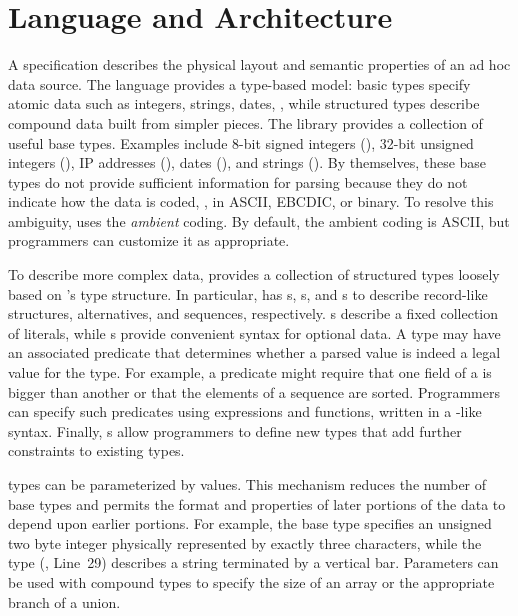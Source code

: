 \section{Language and Architecture}
\label{section:pads}

A \pads{} specification describes the physical layout and 
semantic properties of an ad hoc data source. 
The language provides a type-based model:
basic types specify atomic data such as integers, strings, dates, \etc{}, while
structured types describe compound data built from simpler pieces.
The \pads{} library provides a collection of useful base types.
Examples include
8-bit signed integers (),
32-bit unsigned integers (),
IP addresses (), 
dates (), and strings ().
By themselves, these base types do not provide sufficient information for parsing
because they do not indicate how the data is coded, \ie{}, in ASCII, EBCDIC, or binary.  
To resolve this ambiguity, \pads{} uses the \textit{ambient} coding.
By default, the ambient coding is ASCII, but programmers can customize
it as appropriate.

To describe more complex data, \pads{} provides a collection of 
structured types loosely based on \C{}'s type structure.
In particular, \pads{} has 
s, s, and s to describe
record-like structures, alternatives, and sequences, respectively.
s describe a fixed collection of literals, while s 
provide convenient syntax for optional data.
A type may have an associated predicate that determines
whether a parsed value is indeed a legal
value for the type.  For example, a predicate might require that one
field of a  is bigger than another or that the elements
of a sequence are sorted.  Programmers can specify such
predicates using \pads{} expressions and functions, 
written in a \C{}-like syntax.
Finally, \pads{} s allow programmers
to define new types that add further constraints to existing types.

\pads{} types can be parameterized by values.
This mechanism reduces the number of base types and  permits the
format and properties of later portions of the data to depend upon earlier portions.
For example, 
the base type  specifies an unsigned two byte integer
physically represented by exactly three characters, while the type
  (\eg{}, Line~29)
describes a string terminated by a vertical bar.  Parameters can be 
used with compound types to specify the size of an array or the
appropriate branch of a union.

